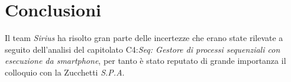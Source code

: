 \section{Conclusioni}
Il team \textit{Sirius} ha risolto gran parte delle incertezze che erano state rilevate a seguito dell'analisi del capitolato C4:\textit{Seq: Gestore di processi sequenziali con esecuzione da smartphone}, per tanto è stato reputato di grande importanza il colloquio con la Zucchetti \textit{S.P.A}.